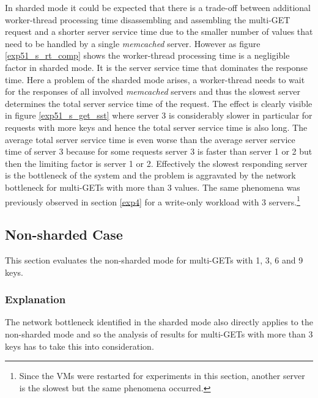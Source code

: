 \documentclass[report.tex]{subfiles}
\begin{document}
In sharded mode it could be expected that there is a trade-off between additional worker-thread processing time disassembling and assembling the multi-GET request and a shorter server service time due to the smaller number of values that need to be handled by a single \emph{memcached} server. However as figure \ref{exp51_s_rt_comp} shows the worker-thread processing time is a negligible factor in sharded mode. It is the server service time that dominates the response time. Here a problem of the sharded mode arises, a worker-thread needs to wait for the responses of all involved \emph{memcached} servers and thus the slowest server determines the total server service time of the request.  The effect is clearly visible in figure \ref{exp51_s_get_sst} where server 3 is considerably slower in particular for requests with more keys and hence the total server service time is also long. The average total server service time is even worse than the average server service time of server 3 because for some requests server 3 is faster than server 1 or 2 but then the limiting factor is server 1 or 2. Effectively the slowest responding server is the bottleneck of the system and the problem is aggravated by the network bottleneck for multi-GETs with more than 3 values.
The same phenomena was previously observed in section \ref{exp4} for a write-only workload with 3 servers.\footnote{Since the VMs were restarted for experiments in this section, another server is the slowest but the same phenomena occurred.}


\subsection{Non-sharded Case}

This section evaluates the non-sharded mode for multi-GETs with 1, 3, 6 and 9 keys.

\subsubsection{Explanation}

The network bottleneck identified in the sharded mode also directly applies to the non-sharded mode and so the analysis of results for multi-GETs with more than 3 keys has to take this into consideration.
\end{document}
